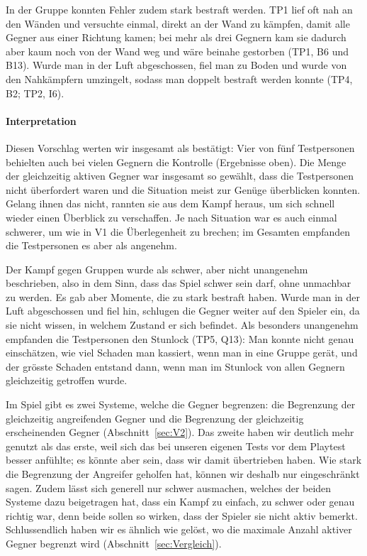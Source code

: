 \documentclass[../Main.tex]{subfiles}
\begin{document}
In der Gruppe konnten Fehler zudem stark bestraft werden. TP1 lief oft nah an den Wänden und versuchte einmal, direkt an der Wand zu kämpfen, damit alle Gegner aus einer Richtung kamen; bei mehr als drei Gegnern kam sie dadurch aber kaum noch von der Wand weg und wäre beinahe gestorben (TP1, B6 und B13). Wurde man in der Luft abgeschossen, fiel man zu Boden und wurde von den Nahkämpfern umzingelt, sodass man doppelt bestraft werden konnte (TP4, B2; TP2, I6).

\paragraph{Interpretation}
Diesen Vorschlag werten wir insgesamt als bestätigt: Vier von fünf Testpersonen behielten auch bei vielen Gegnern die Kontrolle (Ergebnisse oben). Die Menge der gleichzeitig aktiven Gegner war insgesamt so gewählt, dass die Testpersonen nicht überfordert waren und die Situation meist zur Genüge überblicken konnten. Gelang ihnen das nicht, rannten sie aus dem Kampf heraus, um sich schnell wieder einen Überblick zu verschaffen. Je nach Situation war es auch einmal schwerer, um wie in V1 die Überlegenheit zu brechen; im Gesamten empfanden die Testpersonen es aber als angenehm.

Der Kampf gegen Gruppen wurde als schwer, aber nicht unangenehm beschrieben, also in dem Sinn, dass das Spiel schwer sein darf, ohne unmachbar zu werden. Es gab aber Momente, die zu stark bestraft haben. Wurde man in der Luft abgeschossen und fiel hin, schlugen die Gegner weiter auf den Spieler ein, da sie nicht wissen, in welchem Zustand er sich befindet. Als besonders unangenehm empfanden die Testpersonen den Stunlock (TP5, Q13): Man konnte nicht genau einschätzen, wie viel Schaden man kassiert, wenn man in eine Gruppe gerät, und der grösste Schaden entstand dann, wenn man im Stunlock von allen Gegnern gleichzeitig getroffen wurde.

Im Spiel gibt es zwei Systeme, welche die Gegner begrenzen: die Begrenzung der gleichzeitig angreifenden Gegner und die Begrenzung der gleichzeitig erscheinenden Gegner (Abschnitt~\ref{sec:V2}). Das zweite haben wir deutlich mehr genutzt als das erste, weil sich das bei unseren eigenen Tests vor dem Playtest besser anfühlte; es könnte aber sein, dass wir damit übertrieben haben. Wie stark die Begrenzung der Angreifer geholfen hat, können wir deshalb nur eingeschränkt sagen. Zudem lässt sich generell nur schwer ausmachen, welches der beiden Systeme dazu beigetragen hat, dass ein Kampf zu einfach, zu schwer oder genau richtig war, denn beide sollen so wirken, dass der Spieler sie nicht aktiv bemerkt. Schlussendlich haben wir es ähnlich wie  gelöst, wo die maximale Anzahl aktiver Gegner begrenzt wird (Abschnitt~\ref{sec:Vergleich}).
\end{document}
